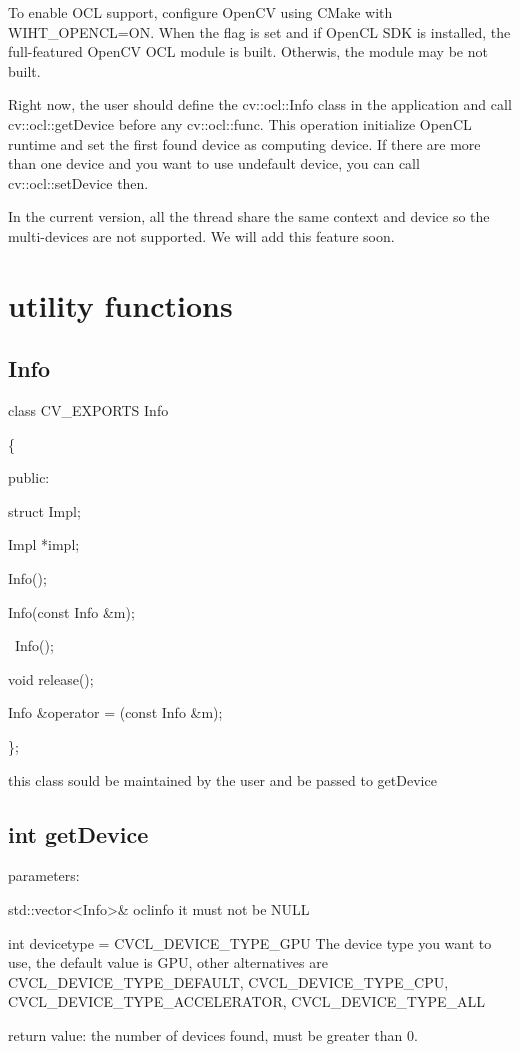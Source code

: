 \documentclass{article}
\begin{document}
To enable OCL support, configure OpenCV using CMake with WIHT\_OPENCL=ON. When the flag is set and if OpenCL SDK is installed, the full-featured OpenCV OCL module is built. Otherwis, the module may be not built.

Right now, the user should define the cv::ocl::Info class in the application and call cv::ocl::getDevice before any cv::ocl::func. This operation initialize OpenCL runtime and set the first found device as computing device. If there are more than one device and you want to use undefault device, you can call cv::ocl::setDevice then.

In the current version, all the thread share the same context and device so the multi-devices are not supported. We will add this feature soon.

\section{utility functions}

\subsection{Info}
class CV\_EXPORTS Info

\{

public:

	struct Impl;

	Impl *impl;

	Info();

	Info(const Info \&m);

	~Info();

	void release();

	Info \&operator = (const Info \&m);

\};

this class sould be maintained by the user and be passed to getDevice

\subsection{int getDevice}


parameters: 

std::vector<Info>\& oclinfo  it must not be NULL

int devicetype = CVCL\_DEVICE\_TYPE\_GPU The device type you want to use, the default value is GPU, other alternatives are CVCL\_DEVICE\_TYPE\_DEFAULT, CVCL\_DEVICE\_TYPE\_CPU, CVCL\_DEVICE\_TYPE\_ACCELERATOR, CVCL\_DEVICE\_TYPE\_ALL

return value: the number of devices found, must be greater than 0.
\end{document}

